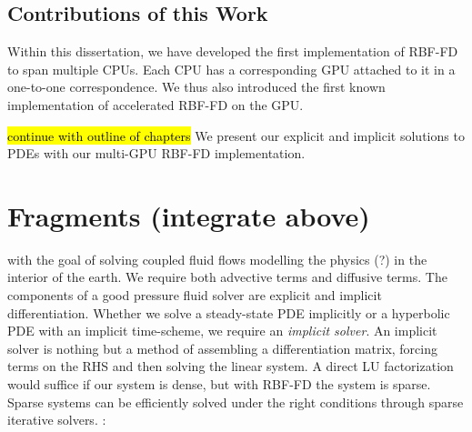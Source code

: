 \documentclass[11pt]{report}
\begin{document}
\section{ Contributions of this Work }

Within this dissertation, we have developed the first implementation of RBF-FD
to span multiple CPUs. Each CPU has a corresponding GPU attached to it
in a one-to-one correspondence. We thus also introduced the first known 
implementation of accelerated RBF-FD on the GPU.

 \hl{continue with outline of chapters} 
We present our explicit and implicit solutions to PDEs with our multi-GPU RBF-FD implementation. 


\chapter{Fragments (integrate above) }

with the goal of solving coupled fluid flows modelling the physics (?) in the interior of the earth. We require both advective terms and diffusive terms. The components of a good pressure fluid solver are explicit and implicit differentiation. Whether we solve a steady-state PDE implicitly or a hyperbolic PDE with an implicit time-scheme, we require an \emph{implicit solver}. An implicit solver is nothing but a method of assembling a differentiation matrix, forcing terms on the RHS and then solving the linear system. A direct LU factorization would suffice if our system is dense, but with RBF-FD the system is sparse. Sparse systems can be efficiently solved under the right conditions through sparse iterative solvers. :
\end{document}
